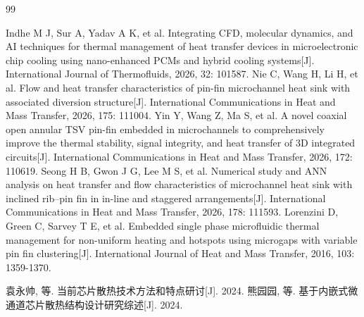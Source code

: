\documentclass[stage1,fontset=fandol]{ydzjreport}
\begin{document}
\begin{thebibliography}{99}
	 
	   Indhe M J, Sur A, Yadav A K, et al. Integrating CFD, molecular dynamics, and AI techniques for thermal management of heat transfer devices in microelectronic chip cooling using nano-enhanced PCMs and hybrid cooling systems[J]. International Journal of Thermofluids, 2026, 32: 101587. 
	   Nie C, Wang H, Li H, et al. Flow and heat transfer characteristics of pin-fin microchannel heat sink with associated diversion structure[J]. International Communications in Heat and Mass Transfer, 2026, 175: 111004.
	   Yin Y, Wang Z, Ma S, et al. A novel coaxial open annular TSV pin-fin embedded in microchannels to comprehensively improve the thermal stability, signal integrity, and heat transfer of 3D integrated circuits[J]. International Communications in Heat and Mass Transfer, 2026, 172: 110619. 
	   Seong H B, Gwon J G, Lee M S, et al. Numerical study and ANN analysis on heat transfer and flow characteristics of microchannel heat sink with inclined rib–pin fin in in-line and staggered arrangements[J]. International Communications in Heat and Mass Transfer, 2026, 178: 111593. 
	   Lorenzini D, Green C, Sarvey T E, et al. Embedded single phase microfluidic thermal management for non-uniform heating and hotspots using microgaps with variable pin fin clustering[J]. International Journal of Heat and Mass Transfer, 2016, 103: 1359-1370. 
	 
	   袁永帅, 等. 当前芯片散热技术方法和特点研讨[J]. 2024.
	   熊园园, 等. 基于内嵌式微通道芯片散热结构设计研究综述[J]. 2024.
	  

\end{thebibliography}
\end{document}
